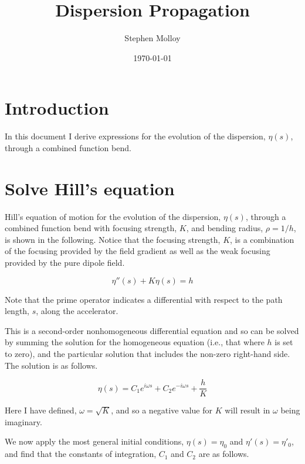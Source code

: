 \documentclass[]{article}
\begin{document}
  \title{Dispersion Propagation}
  \author{Stephen Molloy}
  \date{\today}
  \maketitle

  \section{Introduction}
  In this document I derive expressions for the evolution of the dispersion, $\eta\left(s\right)$, through a combined function bend.

  \section{Solve Hill's equation}
  Hill's equation of motion for the evolution of the dispersion, $\eta\left(s\right)$, through a combined function bend with focusing strength, $K$, and bending radius, $\rho=1/h$, is shown in the following.  Notice that the focusing strength, $K$, is a combination of the focusing provided by the field gradient as well as the weak focusing provided by the pure dipole field.

  \begin{equation}
    \eta''\left(s\right) + K\eta\left(s\right) = h
    \label{eq:hillseqn}
  \end{equation}

  Note that the prime operator indicates a differential with respect to the path length, $s$, along the accelerator.

  This is a second-order nonhomogeneous differential equation and so can be solved by summing the solution for the homogeneous equation (i.e., that where $h$ is set to zero), and the particular solution that includes the non-zero right-hand side.  The solution is as follows.

  \begin{equation}
    \eta\left(s\right) = C_1e^{i\omega s} + C_2e^{-i\omega s} + \frac{h}{K}
    \label{eq:generalsoln}
  \end{equation}

  Here I have defined, $\omega = \sqrt K$, and so a negative value for $K$ will result in $\omega$ being imaginary.

  We now apply the most general initial conditions, $\eta\left(s\right) = \eta_0$ and $\eta'\left(s\right) = \eta'_0$, and find that the constants of integration, $C_1$ and $C_2$ are as follows.
\end{document}

